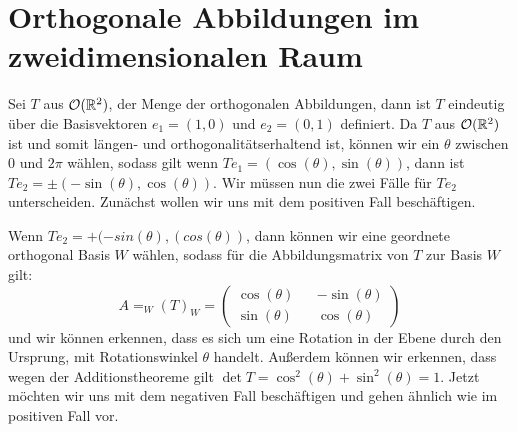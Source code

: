 \section{Orthogonale Abbildungen im zweidimensionalen Raum}
Sei $T$ aus ${\mathcal{O}(\mathbb{R}^2)}$, der Menge der orthogonalen Abbildungen, dann ist $T$ eindeutig über die Basisvektoren $e_1 = (1,0)$ und $e_2 = (0,1)$ definiert. Da $T$ aus ${\mathcal{O}(\mathbb{R}^2)}$ ist und somit längen- und orthogonalitätserhaltend ist, können wir ein $\theta$ zwischen $0$ und $2 \pi$ wählen, sodass gilt wenn $Te_1 = (\cos(\theta),\sin(\theta))$, dann ist $Te_2 = \pm (-\sin(\theta),\cos(\theta))$.
Wir müssen nun die zwei Fälle für $Te_2$ unterscheiden. Zunächst wollen wir uns mit dem positiven Fall beschäftigen. 

Wenn $Te_2 = + (-sin(\theta),(cos(\theta))$, dann können wir eine geordnete orthogonal Basis $W$ wählen, sodass für die Abbildungsmatrix von $T$ zur Basis $W$ gilt:
$$A = _W(T)_W = \begin{pmatrix}
	\cos(\theta) && -\sin(\theta) \\
	\sin(\theta) && \cos(\theta)
\end{pmatrix} $$
und wir können erkennen, dass es sich um eine Rotation in der Ebene durch den Ursprung, mit Rotationswinkel $\theta$ handelt. Außerdem können wir erkennen, dass wegen der Additionstheoreme gilt $\det T = \cos^2(\theta) + \sin^2(\theta) = 1$.
Jetzt möchten wir uns mit dem negativen Fall beschäftigen und gehen ähnlich wie im positiven Fall vor.

